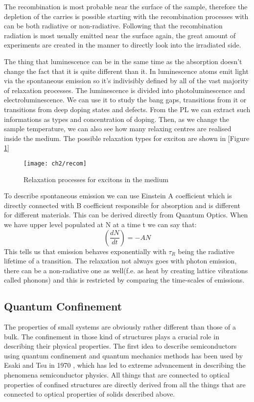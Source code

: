 The recombination is most probable near the surface of the sample, therefore the depletion of the carries is possible starting with the recombination processes with can be both radiative or non-radiative. Following that the recombination radiation is most usually emitted near the surface again, the great amount of experiments are created in the manner to directly look into the irradiated side.

The thing that luminescence can be in the same time as the absorption doesn't change the fact that it is quite different than it. In luminescence atoms emit light via the spontaneous emission so it's indivisibly defined by all of the vast majority of relaxation processes. The luminescence is divided into photoluminescence and electroluminescence. We can use it to study the bang gaps, transitions from it or transitions from deep doping states and defects. From the PL we can extract such informations as types and concentration of doping. Then, as we change the sample temperature, we can also see how many relaxing centres are realised inside the medium. The possible relaxation types for exciton are shown in [Figure \ref{fig:relax}]
\begin{figure}[H]
\centering
\texttt{[image: ch2/recom]}
\caption{Relaxation processes for excitons in the medium\cite{popko}}
\label{fig:relax}
\end{figure}

To describe spontaneous emission we can use Einstein A coefficient which is directly connected with B coefficient responsible for absorption and is different for different materials. This can be derived directly from Quantum Optics. When we have upper level populated at N at a time t we can say that:
\begin{equation}
\left( \frac{dN}{dt} \right) = -AN
\end{equation}
This tells us that emission behaves exponentially with $\tau_R $ being the radiative lifetime of a transition. The relaxation not always goes with photon emission, there can be a non-radiative one as well(f.e. as heat by creating lattice vibrations called phonons) and this is restricted by comparing the time-scales of emissions.  

\subsection{Quantum Confinement}

The properties of small systems are obviously rather different than those of a bulk. The confinement in those kind of structures plays a crucial role in describing their physical properties. The first idea to describe semiconductors using quantum confinement and quantum mechanics methods has been used by Esaki and Tsu in 1970 \cite{Esaki1970}, which has led to extreme advancement in describing the phenomena semiconductor physics. All things that are connected to optical properties of confined structures are directly derived from all the things that are connected to optical properties of solids described above. 

